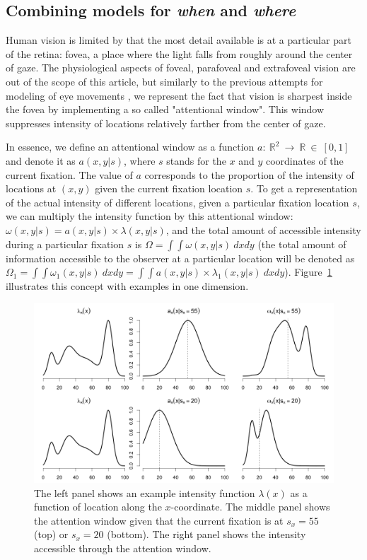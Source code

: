 \documentclass{article}
\begin{document}
\subsection{Combining models for \textit{when} and \textit{where}}

Human vision is limited by that the most detail available is at a particular part of the retina: fovea, a place where the light falls from roughly around the center of gaze. The physiological aspects of foveal, parafoveal and extrafoveal vision are out of the scope of this article, but similarly to the previous attempts for modeling of eye movements \citep{trukenbrod2014icat, schutt2017likelihood,schwetlick2020ccenewalk_extendeds}, we represent the fact that vision is sharpest inside the fovea by implementing a so called "attentional window". This window suppresses intensity of locations relatively farther from the center of gaze.


In essence, we define an attentional window as a function $a:~\mathbb{R}^2~\rightarrow~\mathbb{R}~\in~[0, 1]$ and denote it as $a(x, y | s)$, where $s$ stands for the $x$ and $y$ coordinates of the current fixation. The value of $a$ corresponds to the proportion of the intensity of locations at $(x, y)$ given the current fixation location $s$. To get a representation of the actual intensity of different locations, given a particular fixation location $s$, we can multiply the intensity function by this attentional window: $\omega(x, y | s) = a(x, y | s)\times\lambda(x, y | s)$, and the total amount of accessible intensity during a particular fixation $s$ is $\Omega = \int\int \omega(x, y | s)~dx dy$ (the total amount of information accessible to the observer at a particular location will be denoted as $\Omega_1 = \int\int \omega_1(x, y | s)~dx dy = \int\int a(x, y | s)\times\lambda_1(x, y | s)~dx dy$). Figure~\ref{fig:attention_window} illustrates this concept with examples in one dimension.

\begin{figure}
    \centering
    \includegraphics[width=\linewidth]{figures/attention_window.png}
    \caption{The left panel shows an example intensity function $\lambda(x)$ as a function of location along the $x$-coordinate. The middle panel shows the attention window given that the current fixation is at $s_x = 55$ (top) or $s_x=20$ (bottom). The right panel shows the intensity accessible through the attention window.}
    \label{fig:attention_window}
\end{figure}
\end{document}
